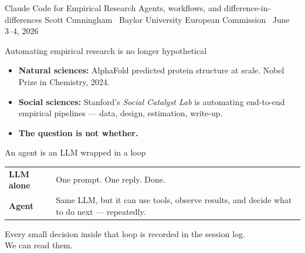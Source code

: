 \documentclass[aspectratio=169,11pt]{beamer}
\begin{document}
\codechellatitle
  {Claude Code for Empirical Research}
  {Agents, workflows, and difference-in-differences}
  {Scott Cunningham \textperiodcentered\ Baylor University}
  {European Commission \textperiodcentered\ June 3--4, 2026}


\begin{frame}{Automating empirical research is no longer hypothetical}
\vspace{0.4em}
\begin{itemize}\setlength\itemsep{0.6em}
  \item \textbf{Natural sciences:} AlphaFold predicted protein structure at scale. Nobel Prize in Chemistry, 2024.
  \item \textbf{Social sciences:} Stanford's \textit{Social Catalyst Lab} is automating end-to-end empirical pipelines --- data, design, estimation, write-up.
  \item \textbf{The question is not whether.} 
\end{itemize}
\end{frame}

\begin{frame}{An agent is an LLM wrapped in a loop}
\vspace{0.6em}
\begin{center}
\begin{tabular}{lp{8cm}}
  \textbf{LLM alone} & One prompt. One reply. Done. \\[0.6em]
  \textbf{Agent}     & Same LLM, but it can use tools, observe results, and decide what to do next --- repeatedly. \\
\end{tabular}
\end{center}
\vspace{0.6em}
\begin{center}
\color{warmgray}\small
Every small decision inside that loop is recorded in the session log.\\
We can read them.
\end{center}
\end{frame}
\end{document}
